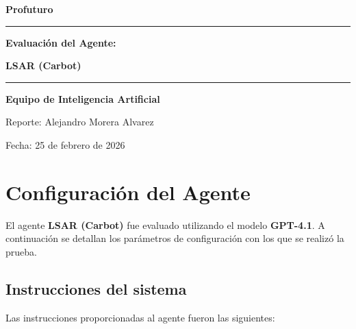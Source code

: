 \documentclass[11pt, a4paper]{article}
\begin{document}
\begin{titlepage}
    \centering
    \vspace*{2cm}
    {\fontsize{40}{48}\selectfont\bfseries\textcolor{profublue}{Profuturo}\par}
    \vspace{0.8cm}
    {\color{profugold}\rule{0.4\textwidth}{2pt}\par}
    \vspace{1.2cm}
    {\fontsize{28}{34}\selectfont\bfseries\textcolor{profublue}{Evaluación del Agente:}\par}
    {\fontsize{28}{34}\selectfont\bfseries\textcolor{profublue}{LSAR (Carbot)}\par}
    \vspace{0.8cm}
    {\color{profugold}\rule{0.4\textwidth}{2pt}\par}
    \vspace{2cm}
    {\large\bfseries Equipo de Inteligencia Artificial\par}
    \vspace{0.5cm}
    {\normalsize Reporte: Alejandro Morera Alvarez \par}
    \vspace{1cm}
    {\normalsize Fecha: 25 de febrero de 2026 \par}
    \vfill
\end{titlepage}

\section{Configuración del Agente}

El agente \textbf{LSAR (Carbot)} fue evaluado utilizando el modelo
\textbf{GPT-4.1}. A continuación se detallan los parámetros
de configuración con los que se realizó la prueba.

\subsection{Instrucciones del sistema}

Las instrucciones proporcionadas al agente fueron las siguientes:
\end{document}
